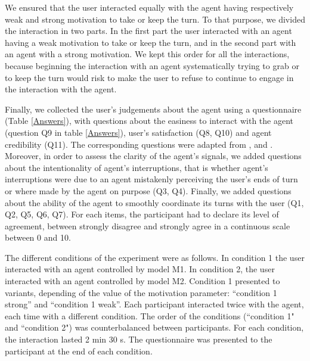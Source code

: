 We ensured that the user interacted equally with the agent having respectively weak and strong motivation to take or keep the turn. To that purpose, we divided the interaction in two parts. In the first part the user interacted with an agent having a weak motivation to take or keep the turn, and in the second part with an agent with a strong motivation.
We kept this order for all the interactions, because beginning the interaction with an agent systematically trying to grab or to keep the turn would risk to make the user to refuse to continue to engage in the interaction with the agent. 

Finally, we collected the user's judgements about the agent using a questionnaire (Table \ref{Answers}), with questions about the easiness to interact with the agent (question Q9 in table \ref{Answers}), user's satisfaction (Q8, Q10) and agent credibility (Q11). The corresponding questions were adapted from \cite{skantze_towards_2010}, \cite{bevacqua_effects_2014} and \cite{de_vault_toward_2015}. Moreover, in order to assess the clarity of the agent's signals, we added questions about the intentionality of agent's interruptions, that is whether agent's interruptions were due to an agent mistakenly perceiving the user's ends of turn or where made by the agent on purpose (Q3, Q4). Finally, we added questions about the ability of the agent to smoothly coordinate its turns with the user (Q1, Q2, Q5, Q6, Q7). For each items, the participant had to declare its level of agreement, between strongly disagree and strongly agree in a continuous scale between 0 and 10. 

The different conditions of the experiment were as follows.
In condition 1 the user interacted with an agent controlled by model M1.
In condition 2, the user interacted with an agent controlled by model M2.
Condition 1 presented to variants, depending of the value of the motivation parameter: ``condition 1 strong'' and ``condition 1 weak''. 
Each participant interacted twice with the agent, each time with a different condition.
The order of the conditions (``condition 1" and ``condition 2") was counterbalanced between participants. For each condition, the interaction lasted 2 min 30 s. The questionnaire was presented to the participant at the end of each condition.


